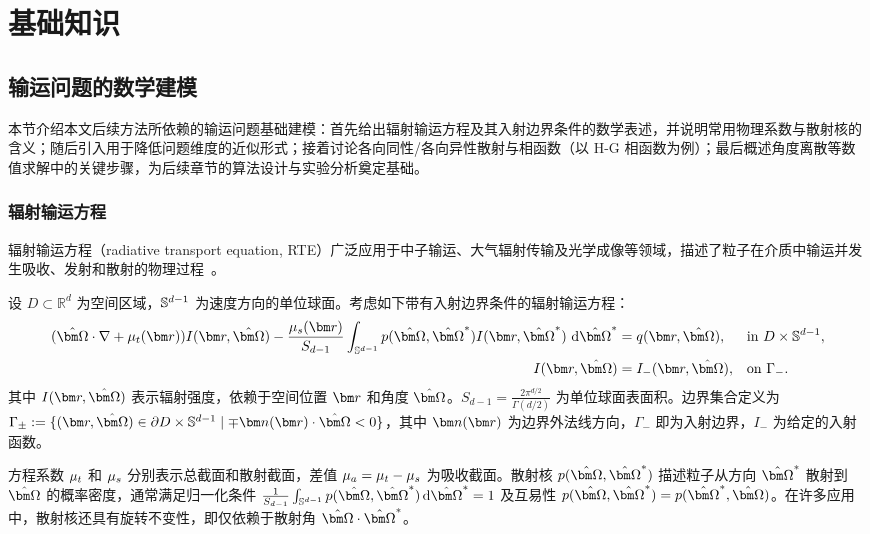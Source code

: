 \chapter{基础知识}

\section{输运问题的数学建模}

本节介绍本文后续方法所依赖的输运问题基础建模：首先给出辐射输运方程及其入射边界条件的数学表述，并说明常用物理系数与散射核的含义；随后引入用于降低问题维度的近似形式；接着讨论各向同性/各向异性散射与相函数（以 H-G 相函数为例）；最后概述角度离散等数值求解中的关键步骤，为后续章节的算法设计与实验分析奠定基础。

\subsection{辐射输运方程}

辐射输运方程（radiative transport equation, RTE）广泛应用于中子输运、大气辐射传输及光学成像等领域，描述了粒子在介质中输运并发生吸收、发射和散射的物理过程~\cite{chandrasekhar2013radiative, zhao2018radiative,zhang2019differential, herman1965numerical}。

设 $D \subset \mathbb{R}^d$ 为空间区域，$\mathbb{S}^{d-1}$ 为速度方向的单位球面。考虑如下带有入射边界条件的辐射输运方程：
\begin{equation}\label{eq:rte}
    \begin{aligned}
        (\bOmega\cdot\nabla + \mu_t(\br)) I(\br,\bOmega)
        - \frac{\mu_s(\br)}{S_{d-1}} \int_{\mathbb{S}^{d-1}} p(\bOmega,\bOmega^*) I(\br,\bOmega^*)\,\diff\bOmega^*
                        & = q(\br,\bOmega),      &  & \text{in } D \times \sS^{d-1}, \\
        I(\br, \bOmega) & = I_{-}(\br, \bOmega), &  & \text{on } \Gamma_{-}.
    \end{aligned}
\end{equation}
其中 $I(\br, \bOmega)$ 表示辐射强度，依赖于空间位置 $\br$ 和角度 $\bOmega$。$S_{d-1} = \frac{2\pi^{d/2}}{\Gamma(d/2)}$ 为单位球面表面积。边界集合定义为 $\Gamma_{\pm} := \{(\br,\bOmega) \in \partial D \times \sS^{d-1} \mid \mp\bn(\br)\cdot\bOmega<0 \}$，其中 $\bn(\br)$ 为边界外法线方向，$\Gamma_{-}$ 即为入射边界，$I_{-}$ 为给定的入射函数。

方程系数 $\mu_t$ 和 $\mu_s$ 分别表示总截面和散射截面，差值 $\mu_a = \mu_t - \mu_s$ 为吸收截面。散射核 $p(\bOmega, \bOmega^*)$ 描述粒子从方向 $\bOmega^*$ 散射到 $\bOmega$ 的概率密度，通常满足归一化条件 $\frac{1}{S_{d-1}}\int_{\sS^{d-1}} p(\bOmega,\bOmega^*) \diff{\bOmega^*} = 1$ 及互易性 $p(\bOmega,\bOmega^*) = p(\bOmega^*,\bOmega)$。在许多应用中，散射核还具有旋转不变性，即仅依赖于散射角 $\bOmega \cdot \bOmega^*$。

